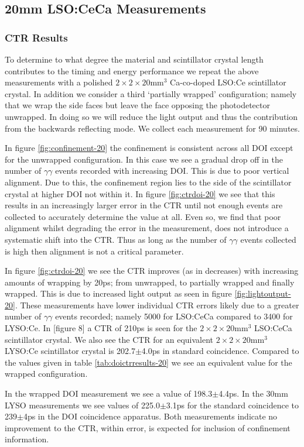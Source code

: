 \subsection{20mm LSO:CeCa Measurements}
\subsubsection{CTR Results}
To determine to what degree the material and scintillator crystal length contributes to the timing and energy performance we repeat the above measurements with a polished $2\times2\times20$mm$^3$ Ca-co-doped LSO:Ce scintillator crystal. In addition we consider a third `partially wrapped' configuration; namely that we wrap the side faces but leave the face opposing the photodetector unwrapped. In doing so we will reduce the light output and thus the contribution from the backwards reflecting mode. We collect each measurement for 90 minutes.

In figure \ref{fig:confinement-20} the confinement is consistent across all DOI except for the unwrapped configuration. In this case we see a gradual drop off in the number of $\gamma\gamma$ events recorded with increasing DOI. This is due to poor vertical alignment. Due to this, the confinement region lies to the side of the scintillator crystal at higher DOI not within it. In figure \ref{fig:ctrdoi-20} we see that this results in an increasingly larger error in the CTR until not enough events are collected to accurately determine the value at all. Even so, we find that poor alignment whilst degrading the error in the measurement, does not introduce a systematic shift into the CTR. Thus as long as the number of $\gamma\gamma$ events collected is high then alignment is not a critical parameter. 

In figure \ref{fig:ctrdoi-20} we see the CTR improves (as in decreases) with increasing amounts of wrapping by 20ps; from unwrapped, to partially wrapped and finally wrapped. This is due to increased light output as seen in figure \ref{fig:lightoutput-20}. These measurements have lower individual CTR errors likely due to a greater number of $\gamma\gamma$ events recorded; namely 5000 for LSO:CeCa compared to 3400 for LYSO:Ce. In [figure 8] \cite{r_Paganoni_Pauwels_et_al__2011} a CTR of 210ps is seen for the $2\times2\times20$mm$^3$ LSO:CeCa scintillator crystal. We also see the CTR for an equivalent $2\times2\times20$mm$^3$ LYSO:Ce scintillator crystal is 202.7$\pm$4.0ps in standard coincidence. Compared to the values given in table \ref{tab:doictrresults-20} we see an equivalent value for the wrapped configuration.

In the wrapped DOI measurement we see a value of 198.3$\pm$4.4ps. In the 30mm LYSO measurements we see values of 225.0$\pm$3.1ps for the standard coincidence to 239$\pm$4ps in the DOI coincidence apparatus. Both measurements indicate no improvement to the CTR, within error, is expected for inclusion of confinement information.


